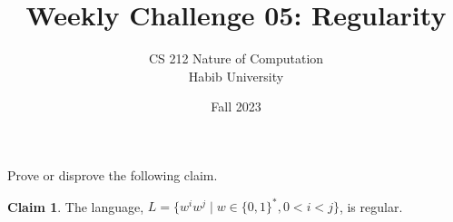 \documentclass[a4paper]{exam}
\title{Weekly Challenge 05: Regularity}
\author{CS 212 Nature of Computation\\Habib University}
\date{Fall 2023}
\theoremstyle{definition}
\theoremstyle{claim}
\newtheorem{claim}{Claim}
\begin{document}
\maketitle

\begin{questions}


  Prove or disprove the following claim.
  \begin{claim}
    The language, $L = \{ w^iw^j \mid w\in\{0,1\}^*, 0 < i < j \}$, is regular.
  \end{claim}

  \begin{solution}
    
  \end{solution}
  
\end{questions}
\end{document}
